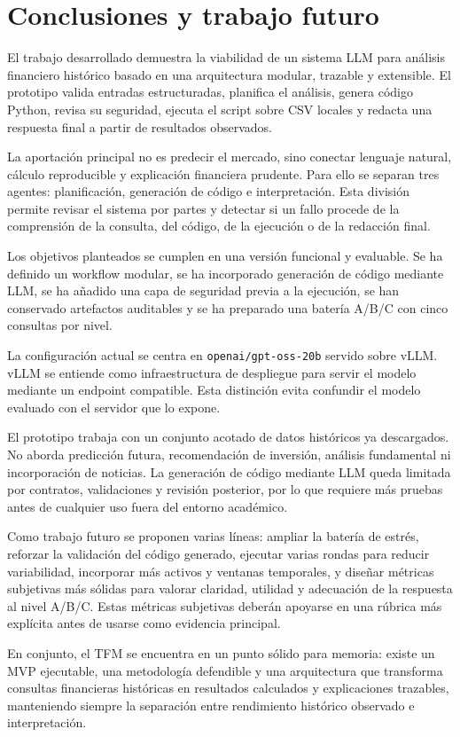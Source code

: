 \chapter{Conclusiones y trabajo futuro}

El trabajo desarrollado demuestra la viabilidad de un sistema LLM para análisis financiero histórico basado en una arquitectura modular, trazable y extensible. El prototipo valida entradas estructuradas, planifica el análisis, genera código Python, revisa su seguridad, ejecuta el script sobre CSV locales y redacta una respuesta final a partir de resultados observados.

La aportación principal no es predecir el mercado, sino conectar lenguaje natural, cálculo reproducible y explicación financiera prudente. Para ello se separan tres agentes: planificación, generación de código e interpretación. Esta división permite revisar el sistema por partes y detectar si un fallo procede de la comprensión de la consulta, del código, de la ejecución o de la redacción final.

Los objetivos planteados se cumplen en una versión funcional y evaluable. Se ha definido un workflow modular, se ha incorporado generación de código mediante LLM, se ha añadido una capa de seguridad previa a la ejecución, se han conservado artefactos auditables y se ha preparado una batería A/B/C con cinco consultas por nivel.

La configuración actual se centra en \texttt{openai/gpt-oss-20b} servido sobre vLLM. vLLM se entiende como infraestructura de despliegue para servir el modelo mediante un endpoint compatible. Esta distinción evita confundir el modelo evaluado con el servidor que lo expone.

El prototipo trabaja con un conjunto acotado de datos históricos ya descargados. No aborda predicción futura, recomendación de inversión, análisis fundamental ni incorporación de noticias. La generación de código mediante LLM queda limitada por contratos, validaciones y revisión posterior, por lo que requiere más pruebas antes de cualquier uso fuera del entorno académico.

Como trabajo futuro se proponen varias líneas: ampliar la batería de estrés, reforzar la validación del código generado, ejecutar varias rondas para reducir variabilidad, incorporar más activos y ventanas temporales, y diseñar métricas subjetivas más sólidas para valorar claridad, utilidad y adecuación de la respuesta al nivel A/B/C. Estas métricas subjetivas deberán apoyarse en una rúbrica más explícita antes de usarse como evidencia principal.

En conjunto, el TFM se encuentra en un punto sólido para memoria: existe un MVP ejecutable, una metodología defendible y una arquitectura que transforma consultas financieras históricas en resultados calculados y explicaciones trazables, manteniendo siempre la separación entre rendimiento histórico observado e interpretación.
